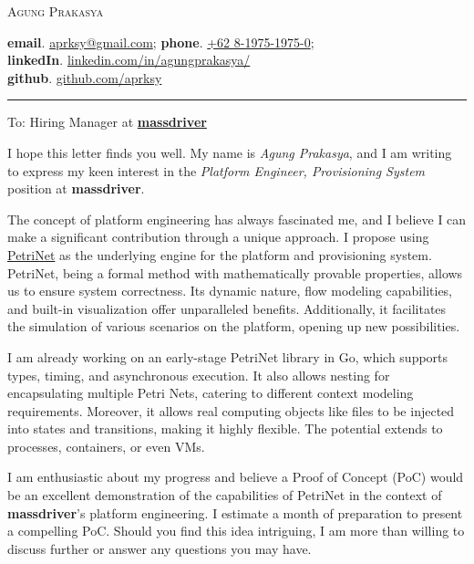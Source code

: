 \documentclass[12pt]{res}
\begin{document}
\begin{center}
	\textsc{Agung Prakasya}

	\textbf{{\scriptsize email}}. \href{mailto:aprksy@gmail.com}{aprksy@gmail.com}; 
	\textbf{{\scriptsize phone}}. \href{https://wa.me/628197519750}{+62 8-1975-1975-0};\\ 
	\textbf{{\scriptsize linkedIn}}. \href{https://www.linkedin.com/in/agungprakasya/}{linkedin.com/in/agungprakasya/}\\ 
	\textbf{{\scriptsize github}}. \href{https://github.com/aprksy}{github.com/aprksy}
\end{center}


\vspace{-20pt}
\begin{center}
	\rule{0.5\textwidth}{1pt}
\end{center}

To: Hiring Manager
at \href{https://massdriver.cloud/}{\textbf{massdriver}}

I hope this letter finds you well. My name is \textit{Agung Prakasya}, and I am writing to express my keen interest in the 
\textit{Platform Engineer, Provisioning System} position at \textbf{massdriver}.

The concept of platform engineering has always fascinated me, and I believe I can make a significant contribution 
through a unique approach. I propose using \href{https://en.wikipedia.org/wiki/Petri_net}{PetriNet} as the underlying 
engine for the platform and provisioning system. 
PetriNet, being a formal method with mathematically provable properties, allows us to ensure system correctness. 
Its dynamic nature, flow modeling capabilities, and built-in visualization offer unparalleled benefits. Additionally, 
it facilitates the simulation of various scenarios on the platform, opening up new possibilities.

I am already working on an early-stage PetriNet library in Go, which supports types, timing, and 
asynchronous execution. It also allows nesting for encapsulating multiple Petri Nets, catering to different context 
modeling requirements. Moreover, it allows real computing objects like files to be injected into states and 
transitions, making it highly flexible. The potential extends to processes, containers, or even VMs.

I am enthusiastic about my progress and believe a Proof of Concept (PoC) would be an excellent demonstration of the 
capabilities of PetriNet in the context of \textbf{massdriver}'s platform engineering. I estimate a month of preparation to 
present a compelling PoC. Should you find this idea intriguing, I am more than willing to discuss further or answer 
any questions you may have.
\end{document}
